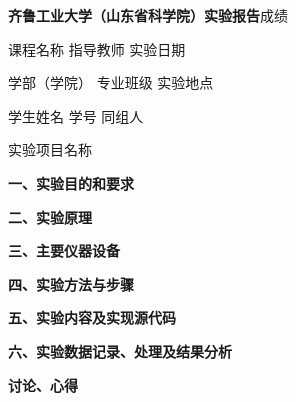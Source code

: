 \documentclass[12pt,a4paper,fontset=fandol]{ctexart}
\newcommand{\blankline}[1]{\underline{\hspace{#1}}}
\begin{document}
\noindent
\textbf{齐鲁工业大学（山东省科学院）实验报告}\hfill 成绩\blankline{3cm}

\vspace{0.6cm}

\noindent
课程名称\blankline{2.5cm}
指导教师\blankline{2.5cm}
实验日期\blankline{2.5cm}

\vspace{0.5cm}

\noindent
学部（学院）\blankline{3cm}
专业班级\blankline{2.5cm}
实验地点\blankline{2.5cm}

\vspace{0.5cm}

\noindent
学生姓名\blankline{2.5cm}
学号\blankline{2.5cm}
同组人\blankline{3cm}

\vspace{0.6cm}

\noindent
实验项目名称\blankline{8cm}

\vspace{0.8cm}


\noindent
\textbf{一、实验目的和要求}

\vspace{2cm}

\noindent
\textbf{二、实验原理}

\vspace{2cm}

\noindent
\textbf{三、主要仪器设备}

\vspace{2cm}

\noindent
\textbf{四、实验方法与步骤}

\vspace{2cm}

\noindent
\textbf{五、实验内容及实现源代码}

\vspace{2cm}

\noindent
\textbf{六、实验数据记录、处理及结果分析}

\vspace{2cm}

\noindent
\textbf{讨论、心得}

\vspace{2cm}
\end{document}
